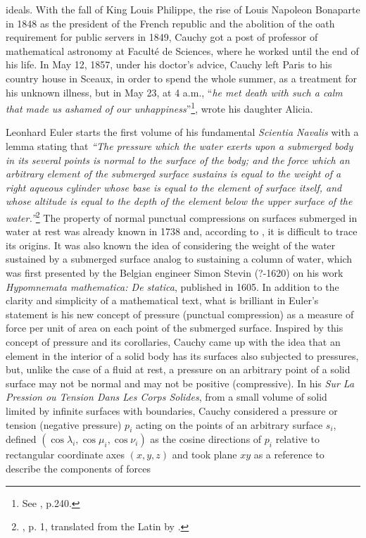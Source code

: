 ideals. With the fall of King Louis Philippe, the rise of Louis Napoleon Bonaparte in 1848 as the president of the French republic and the abolition of the oath requirement for public servers in 1849, Cauchy got a post of professor of mathematical astronomy at Facult\'e de Sciences, where he worked until the end of his life. In May 12, 1857, under his doctor's advice, Cauchy left Paris to his country house in Sceaux, in order to spend the whole summer, as a treatment for his unknown illness, but in May 23, at 4 a.m., ``\emph{he met death with such a calm that made us ashamed of our unhappiness}''\footnote{See \cite{belhoste_1991_1}, p.240.}, wrote his daughter Alicia. 

Leonhard Euler starts the first volume of his fundamental \emph{Scientia Navalis} with a lemma stating that \emph{``The pressure which the water exerts upon a submerged body in its several points is normal to the surface of the body; and the force which an arbitrary element of the submerged surface sustains is equal to the weight of a right aqueous cylinder whose base is equal to the element of surface itself, and whose altitude is equal to the depth of the element below the upper surface of the water.''}\footnote{\cite{euler_1749_1}, p. 1, translated from the Latin by \cite{truesdell_1954_1}.} The property of normal punctual compressions on surfaces submerged in water at rest was already known in 1738 and, according to \cite{truesdell_1954_1}, it is difficult to trace its origins. It was also known the idea of considering the weight of the water sustained by a submerged surface analog to sustaining a column of water, which was first presented by the Belgian engineer Simon Stevin (?-1620) on his work \emph{Hypomnemata mathematica: De statica}, published in 1605. In addition to the clarity and simplicity of a mathematical text, what is brilliant in Euler's statement is his new concept of pressure (punctual compression) as a measure of force per unit of area on each point of the submerged surface. Inspired by this concept of pressure and its corollaries, Cauchy came up with the idea that an element in the interior of a solid body has its surfaces also subjected to pressures, but, unlike the case of a fluid at rest, a pressure on an arbitrary point of a solid surface may not be normal and may not be positive (compressive).  In his \emph{Sur La Pression ou Tension Dans Les Corps Solides}, from a small volume of solid limited by infinite surfaces with boundaries, Cauchy considered a pressure or tension (negative pressure) $p_i$ acting on the points of an arbitrary surface $s_i$, defined $(\cos\lambda_i,\cos\mu_i,\cos\nu_i)$ as the cosine directions of $p_i$ relative to rectangular coordinate axes $(x,y,z)$ and took plane $xy$ as a reference to describe the components of forces
